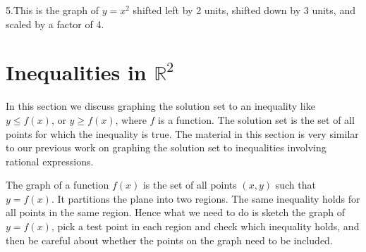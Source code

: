 \documentclass[11pt]{book}               %
\newtheorem{example}{Example}
\begin{document}
5.This is the graph of $y=x^2$ shifted left by 2 units, shifted down by 3 units, and scaled by a factor of 4.
\begin{center}
\end{center}

\newpage
\section{Inequalities in $\mathbb{R}^2$ }

In this section we discuss graphing the solution set to an inequality like $y \leq f(x)$, or $y \geq f(x)$, where $f$ is a function.  The solution set is the set of all points for which the inequality is true.  The material in this section is very 
similar to our previous work on graphing the solution set to inequalities involving rational expressions.

The graph of a function $f(x)$ is the set of all points $(x, y)$ such that $y = f(x)$.  
It partitions the plane into two regions.  
The same inequality holds for all points in the same region.
Hence what we need to do is sketch the graph of $y = f(x)$, pick a test point in each region and check which inequality holds, and then be careful about whether the points on the graph need to be included.

%
%
%
%
%
%
\end{document}
